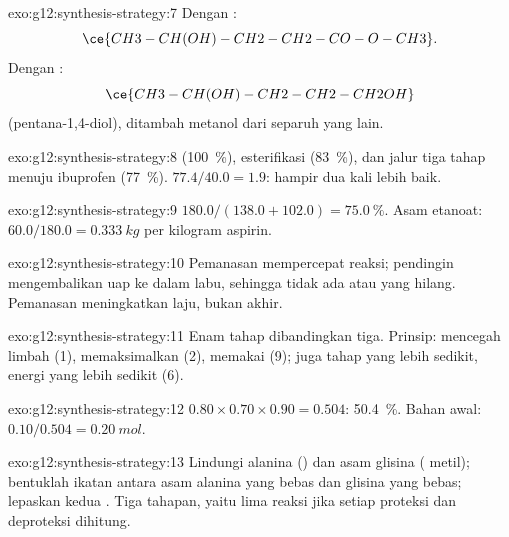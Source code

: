 \begin{solution}{exo:g12:synthesis-strategy:7}
Dengan :
\[ \ce{CH3-CH(OH)-CH2-CH2-CO-O-CH3} . \]
Dengan :
\[ \ce{CH3-CH(OH)-CH2-CH2-CH2OH} \]
(pentana-1,4-diol), ditambah metanol dari separuh  yang lain.
\end{solution}

\begin{solution}{exo:g12:synthesis-strategy:8}
 (\qty{100}{\percent}), esterifikasi (\qty{83}{\percent}), dan
jalur tiga tahap menuju ibuprofen (\qty{77}{\percent}).
$77.4/40.0 = 1.9$: hampir dua kali lebih baik.
\end{solution}

\begin{solution}{exo:g12:synthesis-strategy:9}
$180.0/(138.0 + 102.0) = \qty{75.0}{\percent}$. Asam etanoat:
$60.0/180.0 = \qty{0.333}{kg}$ per kilogram aspirin.
\end{solution}

\begin{solution}{exo:g12:synthesis-strategy:10}
Pemanasan mempercepat reaksi; pendingin mengembalikan uap ke dalam labu,
sehingga tidak ada  atau  yang hilang. Pemanasan
meningkatkan laju, bukan  akhir.
\end{solution}

\begin{solution}{exo:g12:synthesis-strategy:11}
Enam tahap dibandingkan tiga. Prinsip: mencegah limbah (1),
memaksimalkan  (2), memakai  (9); juga tahap yang
lebih sedikit, energi yang lebih sedikit (6).
\end{solution}

\begin{solution}{exo:g12:synthesis-strategy:12}
$0.80 \times 0.70 \times 0.90 = 0.504$: \qty{50.4}{\percent}. Bahan
awal: $0.10/0.504 = \qty{0.20}{mol}$.
\end{solution}

\begin{solution}{exo:g12:synthesis-strategy:13}
Lindungi  alanina () dan asam glisina ( metil);
bentuklah ikatan  antara asam alanina yang bebas dan  glisina
yang bebas; lepaskan kedua . Tiga tahapan, yaitu lima
reaksi jika setiap proteksi dan deproteksi dihitung.
\end{solution}

